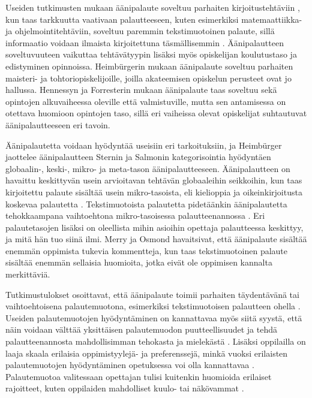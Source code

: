 \documentclass[utf8]{gradu3}
\begin{document}
Useiden tutkimusten mukaan äänipalaute soveltuu parhaiten kirjoitustehtäviin \parencite{academics, engaging, using}, kun taas tarkkuutta vaativaan palautteeseen, kuten esimerkiksi matemaattiikka- ja ohjelmointitehtäviin, soveltuu paremmin tekstimuotoinen palaute, sillä informaatio voidaan ilmaista kirjoitettuna täsmällisemmin \parencite{academics}. Äänipalautteen soveltuvuuteen vaikuttaa tehtävätyypin lisäksi myös opiskelijan koulutustaso ja edistyminen opinnoissa. Heimbürgerin \parencite*{using} mukaan äänipalaute soveltuu parhaiten maisteri- ja tohtoriopiskelijoille, joilla akateemisen opiskelun perusteet ovat jo hallussa. Hennessyn ja Forresterin \parencite*{developing} mukaan äänipalaute taas soveltuu sekä opintojen alkuvaiheessa oleville että valmistuville, mutta sen antamisessa on otettava huomioon opintojen taso, sillä eri vaiheissa olevat opiskelijat suhtautuvat äänipalautteeseen eri tavoin.

Äänipalautetta voidaan hyödyntää useisiin eri tarkoituksiin, ja Heimbürger \parencite*{using} jaottelee äänipalautteen Sternin ja Salmonin \parencite*{stern} kategorisointia hyödyntäen globaalin-, keski-, mikro- ja meta-tason äänipalautteeseen. Äänipalautteen on havaittu keskittyvän usein arvioitavan tehtävän globaaleihin seikkoihin, kun taas kirjoitettu palaute sisältää usein mikro-tasoista, eli kielioppia ja oikeinkirjoitusta koskevaa palautetta \parencite{versus}. Tekstimuotoista palautetta pidetäänkin äänipalautetta tehokkaampana vaihtoehtona mikro-tasoisessa palautteenannossa \parencite{ice}. Eri palautetasojen lisäksi on oleellista mihin asioihin opettaja palautteessa keskittyy, ja mitä hän tuo siinä ilmi. Merry ja Osmond \parencite*{attitudes} havaitsivat, että äänipalaute sisältää enemmän oppimista tukevia kommentteja, kun taas tekstimuotoinen palaute sisältää enemmän sellaisia huomioita, jotka eivät ole oppimisen kannalta merkittäviä.

Tutkimustulokset osoittavat, että äänipalaute toimii parhaiten täydentävänä tai vaihtoehtoisena palautemuotona, esimerkiksi tekstimuotoisen palautteen ohella \parencite{academics, modes, ice}. Useiden palautemuotojen hyödyntäminen on kannattavaa myös siitä syystä, että näin voidaan välttää yksittäisen palautemuodon puutteellisuudet ja tehdä palautteenannosta mahdollisimman tehokasta ja mielekästä \parencite{modes}. Lisäksi oppilailla on laaja skaala erilaisia oppimistyylejä- ja preferenssejä, minkä vuoksi erilaisten palautemuotojen hyödyntäminen opetuksessa voi olla kannattavaa \parencite{style}. Palautemuotoa valitessaan opettajan tulisi kuitenkin huomioida erilaiset rajoitteet, kuten oppilaiden mahdolliset kuulo- tai näkövammat \parencite{evaluating}.
\end{document}
